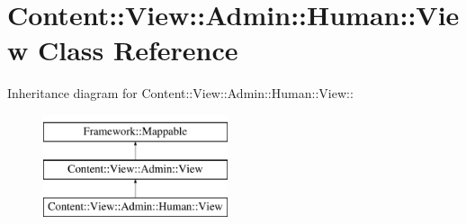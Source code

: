 \hypertarget{classContent_1_1View_1_1Admin_1_1Human_1_1View}{
\section{Content::View::Admin::Human::View Class Reference}
\label{classContent_1_1View_1_1Admin_1_1Human_1_1View}
}
Inheritance diagram for Content::View::Admin::Human::View::\begin{figure}[H]
\begin{center}
\leavevmode
\includegraphics[height=3cm]{classContent_1_1View_1_1Admin_1_1Human_1_1View}
\end{center}
\end{figure}
